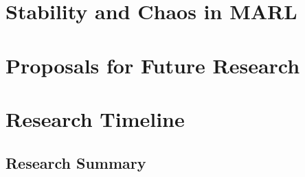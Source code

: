 \documentclass[11pt]{report}
\begin{document}
\chapter{Stability and Chaos in MARL}  
\label{ch::ShortTermGoals}

\chapter{Proposals for Future Research}  
\label{ch::ProposedResearch}

\chapter{Research Timeline}  \label{ch::ResearchTimeline}

 



\begin{appendices}
      \chapter{Research Summary}  \label{app::ResearchSummary}
\end{appendices}  
\end{document}
